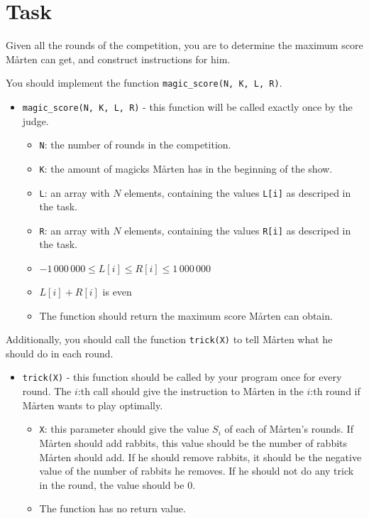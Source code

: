 \section*{Task}
Given all the rounds of the competition, you are to determine the maximum score Mårten can get,
and construct instructions for him.

You should implement the function \texttt{magic\_score(N, K, L, R)}.
\begin{itemize}
  \item \texttt{magic\_score(N, K, L, R)} - this function will be called exactly once by the judge.
  \begin{itemize}
    \item \texttt{N}: the number of rounds in the competition.
    \item \texttt{K}: the amount of magicks Mårten has in the beginning of the show.
    \item \texttt{L}: an array with $N$ elements, containing the values \texttt{L[i]} as descriped in the task.
    \item \texttt{R}: an array with $N$ elements, containing the values \texttt{R[i]} as descriped in the task.
    \item $-1\,000\,000 \le L[i] \le R[i] \le 1\,000\,000$
    \item $L[i] + R[i]$ is even
    \item The function should return the maximum score Mårten can obtain.
  \end{itemize}

\end{itemize}

Additionally, you should call the function \texttt{trick(X)} to tell Mårten what he should do in each round.
\begin{itemize}
  \item \texttt{trick(X)} - this function should be called by your program once for every round. The $i$:th call should give the instruction
    to Mårten in the $i$:th round if Mårten wants to play optimally.
  \begin{itemize}
    \item \texttt{X}: this parameter should give the value $S_i$ of each of Mårten's rounds.
      If Mårten should add rabbits,
      this value should be the number of rabbits Mårten should add. If he should remove rabbits, it should be the negative
      value of the number of rabbits he removes. If he should not do any trick in the round, the value should be $0$. 
    \item The function has no return value.
  \end{itemize}
\end{itemize}


